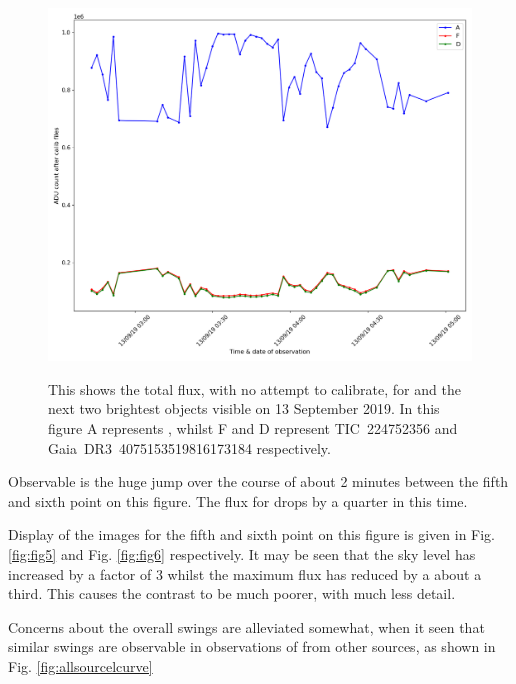 \begin{figure}[!htbp]
\begin{center}
\includegraphics[scale=0.40]{images/all130919.png} \\
\end{center}
\caption{This shows the total flux, with no attempt to calibrate, for {\ross}
and the next two brightest objects visible on 13 September 2019. In this figure
A represents \ross, whilst F and D represent TIC~224752356 and
Gaia~DR3~4075153519816173184 respectively.}\protect\label{fig:2019sept13}
\end{figure}

Observable is the huge jump over the course of about 2 minutes between the
fifth and sixth point on this figure. The flux for {\ross} drops by a quarter in
this time.

Display of the images for the fifth and sixth point on this figure is given in
Fig. \ref{fig:fig5} and Fig. \ref{fig:fig6} respectively. It may be seen that
the sky level has increased by a factor of 3 whilst the maximum flux has reduced
by a about a third. This causes the contrast to be much poorer, with much less
detail.

Concerns about the overall swings are alleviated somewhat, when it seen that
similar swings are observable in observations of {\ross} from other sources, as
shown in Fig. \ref{fig:allsourcelcurve}

